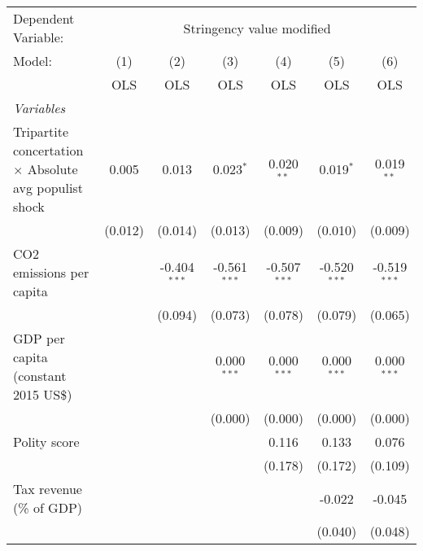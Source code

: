 
\begingroup
\centering
\begin{tabular}{lcccccc}
   \toprule
   Dependent Variable: & \multicolumn{6}{c}{Stringency value modified}\\
   Model:                                                        & (1)     & (2)            & (3)            & (4)            & (5)            & (6)\\  
                                                                 &  OLS    & OLS            & OLS            & OLS            & OLS            & OLS\\  
   \midrule
   \emph{Variables}\\
   Tripartite concertation $\times$ Absolute avg populist shock  & 0.005   & 0.013          & 0.023$^{*}$    & 0.020$^{**}$   & 0.019$^{*}$    & 0.019$^{**}$\\   
                                                                 & (0.012) & (0.014)        & (0.013)        & (0.009)        & (0.010)        & (0.009)\\   
   CO2 emissions per capita                                      &         & -0.404$^{***}$ & -0.561$^{***}$ & -0.507$^{***}$ & -0.520$^{***}$ & -0.519$^{***}$\\   
                                                                 &         & (0.094)        & (0.073)        & (0.078)        & (0.079)        & (0.065)\\   
   GDP per capita (constant 2015 US\$)                           &         &                & 0.000$^{***}$  & 0.000$^{***}$  & 0.000$^{***}$  & 0.000$^{***}$\\   
                                                                 &         &                & (0.000)        & (0.000)        & (0.000)        & (0.000)\\   
   Polity score                                                  &         &                &                & 0.116          & 0.133          & 0.076\\   
                                                                 &         &                &                & (0.178)        & (0.172)        & (0.109)\\   
   Tax revenue (\% of GDP)                                       &         &                &                &                & -0.022         & -0.045\\   
                                                                 &         &                &                &                & (0.040)        & (0.048)\\   

\end{tabular}
